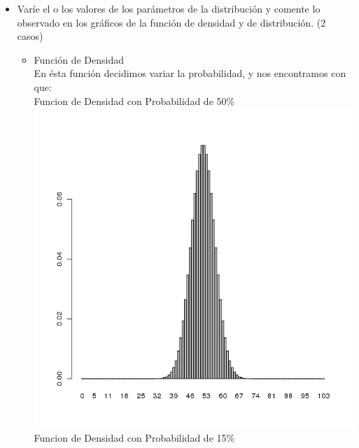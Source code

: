 \begin{itemize}
	\item Var\'ie el o los valores de los par\'ametros de la distribuci\'on y comente lo observado en los gr\'aficos de la funci\'on de densidad y de distribuci\'on. (2 casos)\\
	\begin{itemize}
		\item Funci\'on de Densidad\\
			En \'esta funci\'on decidimos variar la probabilidad, y nos encontramos con que:\\
			Funcion de Densidad con Probabilidad de 50\% \\
			\includegraphics[scale=0.4]{images/1_1-dbinom-prob-variada1}\\
			Funcion de Densidad con Probabilidad de 15\% \\

\end{itemize}
\end{itemize}
